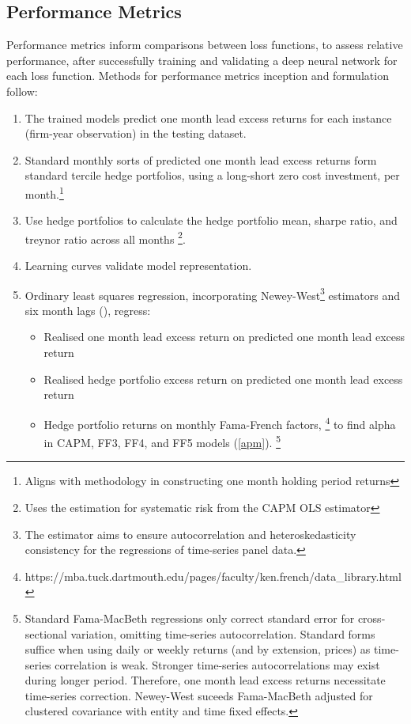 \documentclass[12pt]{article}
\begin{document}
\subsection{Performance Metrics}
Performance metrics inform comparisons between loss functions, to assess relative performance, after successfully training and validating a deep neural network for each loss function.
Methods for performance metrics inception and formulation follow:
\singlespacing
\begin{enumerate}
	\item The trained models predict one month lead excess returns for each instance (firm-year observation) in the testing dataset.
	\item Standard monthly sorts of predicted one month lead excess returns form standard tercile hedge portfolios, using a long-short zero cost investment, per month.\footnote{Aligns with methodology in constructing one month holding period returns}
	\item Use hedge portfolios to calculate the hedge portfolio mean, sharpe ratio, and treynor ratio across all months \footnote{Uses the estimation for systematic risk from the CAPM OLS estimator}.
	\item Learning curves validate model representation.
	\item Ordinary least squares regression, incorporating Newey-West\footnote{The estimator aims to ensure autocorrelation and heteroskedasticity consistency for the regressions of time-series panel data.} estimators and six month lags (\cite{newey1987hypothesis}),
	regress: 
	\begin{itemize}
		\item Realised one month lead excess return on predicted one month lead excess return
		\item Realised hedge portfolio excess return on predicted one month lead excess return 
		\item Hedge portfolio returns on monthly Fama-French factors, \footnote{https://mba.tuck.dartmouth.edu/pages/faculty/ken.french/data\_library.html} to find alpha in CAPM, FF3, FF4, and FF5 models (\ref{apm}).
		\footnote{Standard Fama-MacBeth regressions only correct standard error for cross-sectional variation, omitting time-series autocorrelation.
		Standard forms suffice when using daily or weekly returns (and by extension, prices) as time-series correlation is weak.
		Stronger time-series autocorrelations may exist during longer period. Therefore, one month lead excess returns necessitate time-series correction.
		Newey-West suceeds Fama-MacBeth adjusted for clustered covariance with entity and time fixed effects.}
	\end{itemize}
\end{enumerate}
\doublespacing
\newpage
\end{document}
